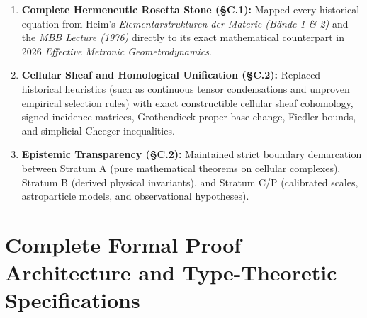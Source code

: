 \documentclass[
    12pt,
    a4paper,
    headings=normal,
    twoside=false,
    open=any,
    parskip=half
]{scrbook}
\begin{document}
\begin{tcolorbox}[colback=maincolor!3!white, colframe=maincolor!80!black, title={\textbf{Grand Synthesis of Appendix C}}]
\begin{enumerate}[leftmargin=1.5em, itemsep=5pt]
    \item \textbf{Complete Hermeneutic Rosetta Stone (§C.1):} Mapped every historical equation from Heim's \textit{Elementarstrukturen der Materie (Bände 1 \& 2)} and the \textit{MBB Lecture (1976)} directly to its exact mathematical counterpart in 2026 \textit{Effective Metronic Geometrodynamics}.
    \item \textbf{Cellular Sheaf and Homological Unification (§C.2):} Replaced historical heuristics (such as continuous tensor condensations and unproven empirical selection rules) with exact constructible cellular sheaf cohomology, signed incidence matrices, Grothendieck proper base change, Fiedler bounds, and simplicial Cheeger inequalities.
    \item \textbf{Epistemic Transparency (§C.2):} Maintained strict boundary demarcation between Stratum A (pure mathematical theorems on cellular complexes), Stratum B (derived physical invariants), and Stratum C/P (calibrated scales, astroparticle models, and observational hypotheses).
\end{enumerate}
\end{tcolorbox}

\chapter{Complete Formal Proof Architecture and Type-Theoretic Specifications}
\label{app:complete_mathlib4_proof_certificate}
\end{document}
